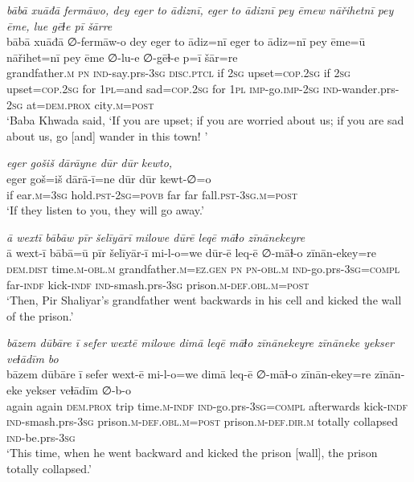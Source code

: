 \ea \label{BP.160}
\textit{bābā xuāđā fermāwo, dey eger to ādiznī, eger to ādiznī pey ēmew nāřihetnī pey ēme, lue gēɫe pī šārre} \\ 
\gll bābā xuāđā ∅-fermāw-o dey eger to ādiz=nī eger to ādiz=nī pey ēme=ū nāřihet=nī pey ēme ∅-lu-e ∅-gēɫ-e p=ī šār=re \\ 
 grandfather\textsc{.m} \textsc{pn} \textsc{ind-}say.prs\textsc{-3sg} \textsc{disc.ptcl} if \textsc{2sg} upset\textsc{=cop}\textsc{.\textsc{2sg}} if \textsc{2sg} upset\textsc{=cop}\textsc{.\textsc{2sg}} for \textsc{1pl}=and sad\textsc{=cop}\textsc{.\textsc{2sg}} for \textsc{1pl} \textsc{imp-}go.\textsc{imp-}\textsc{2sg} \textsc{ind-}wander.prs-\textsc{2sg} at=\textsc{dem.prox} city\textsc{.m}\textsc{=\textsc{post}} \\ 
\glt `Baba Khwada said, ‘If you are upset; if you are worried about us; if you are sad about us, go [and] wander in this town! '
\z 
 
\ea \label{BP.163}
\textit{eger gošiš dārāyne dūr dūr kewto,} \\ 
\gll eger goš=iš dārā-ī=ne dūr dūr kewt-∅=o \\ 
 if ear\textsc{.m}\textsc{=3sg} hold\textsc{.pst}-\textsc{2sg}\textsc{=\textsc{povb}} far far fall\textsc{.pst}\textsc{-3sg}\textsc{.m}\textsc{=\textsc{post}} \\ 
\glt `If they listen to you, they will go away.'
\z 
 
\ea \label{BP.168}
\textit{ā wextī bābāw pīr šelīyārī milowe dūrē leqē māɫo zīnānekeyre} \\ 
\gll ā wext-ī bābā=ū pīr šelīyār-ī mi-l-o=we dūr-ē leq-ē ∅-māɫ-o zīnān-ekey=re \\ 
 \textsc{dem.dist} time\textsc{.m}\textsc{-obl}\textsc{.m} grandfather\textsc{.m}\textsc{=ez.gen} \textsc{pn} \textsc{pn}\textsc{-obl}\textsc{.m} \textsc{ind-}go.prs\textsc{-3sg}\textsc{=compl} far\textsc{-indf} kick\textsc{-indf} \textsc{ind-}smash.prs\textsc{-3sg} prison\textsc{.m}\textsc{-def}\textsc{.obl}\textsc{.m}\textsc{=\textsc{post}} \\ 
\glt `Then, Pir Shaliyar’s grandfather went backwards in his cell and kicked the wall of the prison.'
\z 
 
\ea \label{BP.173}
\textit{bāzem dūbāre ī sefer wextē milowe dimā leqē māɫo zīnānekeyre zīnāneke yekser veɫādīm bo} \\ 
\gll bāzem dūbāre ī sefer wext-ē mi-l-o=we dimā leq-ē ∅-māɫ-o zīnān-ekey=re zīnān-eke yekser veɫādīm ∅-b-o \\ 
 again again \textsc{dem.prox} trip time\textsc{.m}\textsc{-indf} \textsc{ind-}go.prs\textsc{-3sg}\textsc{=compl} afterwards kick\textsc{-indf} \textsc{ind-}smash.prs\textsc{-3sg} prison\textsc{.m}\textsc{-def}\textsc{.obl}\textsc{.m}\textsc{=\textsc{post}} prison\textsc{.m}\textsc{-def}\textsc{.dir}\textsc{.m} totally collapsed \textsc{ind-}be.prs\textsc{-3sg} \\ 
\glt `This time, when he went backward and kicked the prison [wall], the prison totally collapsed.'
\z 
 
